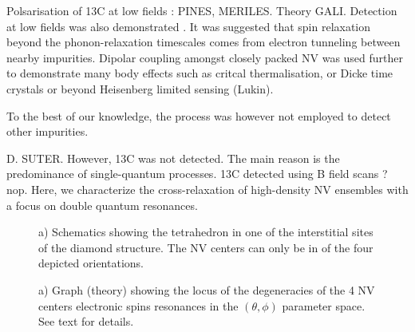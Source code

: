 \documentclass[preprintnumbers,amsmath,amssymb,twocolumn]{revtex4-1}
\begin{document}
Polsarisation of 13C at low fields : PINES, MERILES. 
Theory GALI.
Detection at low fields was also demonstrated \cite{van_oort_optically_1991, van_oort_cross-relaxation_1989, armstrong_nvnv_2010, jarmola_longitudinal_2015, akhmedzhanov_microwave-free_2017, akhmedzhanov_magnetometry_2019, holliday_optical_1989, choi_depolarization_2017}. It was suggested that spin relaxation beyond the phonon-relaxation timescales comes from electron tunneling between nearby impurities. 
Dipolar coupling amongst closely packed NV was used further to demonstrate many body effects such as critcal thermalisation, or Dicke time crystals or beyond Heisenberg limited sensing (Lukin).
 
To the best of our knowledge, the process was however not employed to detect other impurities. 


D. SUTER.
However, 13C was not detected. The main reason is the predominance of single-quantum processes.
13C detected using B field scans ? nop. 
Here, we characterize the cross-relaxation of high-density NV ensembles with a focus on double quantum resonances. 

\begin{figure}[!ht]
  \caption{a) Schematics showing the tetrahedron in one of the interstitial sites of the diamond structure. The NV centers can only be in of the four depicted orientations. 
   }\label{Cristallo}
\end{figure}

\begin{figure}[!ht]
  \caption{a) 
Graph (theory) showing the locus of the degeneracies of the 4 NV centers electronic spins resonances in the $(\theta,\phi)$ parameter space. See text for details.  
 }
\end{figure}
\end{document}

